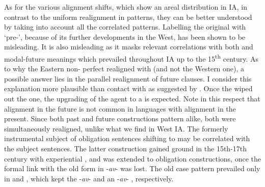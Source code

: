 \documentclass[output=paper]{langsci/langscibook}
\begin{document}
  As for the various alignment shifts, which show an areal distribution in IA, in contrast to the  uniform realignment in  patterns, they can be better understood by taking into account all the correlated patterns. Labelling the original  with  ‘pre-’, because of its further developments in the West, has been shown to be misleading. It is also misleading as it masks relevant correlations with both   and modal-future meanings which prevailed throughout IA up to the 15\textsuperscript{th} century. As to why the Eastern non- perfect realigned with  (and not the Western one), a possible answer lies in the parallel realignment of future clauses. I consider this explanation more plausible than contact with  as suggested by \citet{Chatterji1926}. Once the  wiped out the  one, the upgrading of the agent to a  is expected. Note in this respect that  alignment in the future is not common in languages with  alignment in the present. Since both past and future constructions pattern alike, both were simultaneously realigned, unlike what we find in West IA. The formerly instrumental subject of obligation sentences shifting to  may be correlated with the  subject sentences. The latter construction gained ground in the 15th-17th century with experiential , and was extended to obligation constructions, once the formal link with the old form in -\textit{av}{}- was lost. The old case pattern prevailed only in  and , which kept the -\textit{av}{}-  and an -\textit{av}{}- , respectively.
\end{document}
